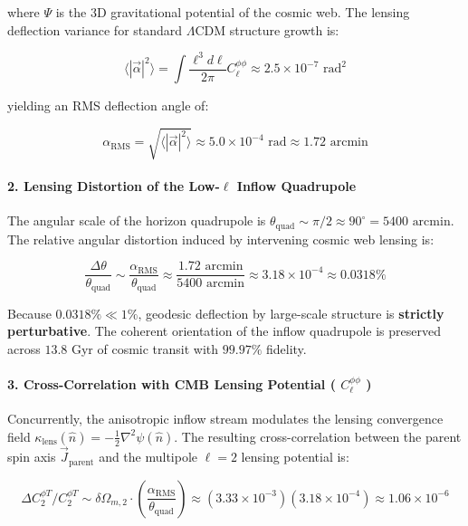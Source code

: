 \documentclass[11pt,a4paper]{article}
\theoremstyle{definition}\newtheorem{definition}{Definition}
\theoremstyle{remark}\newtheorem{remark}{Remark}
\begin{document}
where $\Psi$ is the 3D gravitational potential of the cosmic web.
The lensing deflection variance for standard $\Lambda$CDM structure growth is:


\begin{equation}
\langle |\vec{\alpha}|^2 \rangle = \int \frac{\ell^3 d\ell}{2\pi} C_\ell^{\phi\phi} \approx 2.5 \times 10^{-7}\text{ rad}^2
\end{equation}


yielding an RMS deflection angle of:


\begin{equation}
\alpha_{\text{RMS}} = \sqrt{\langle |\vec{\alpha}|^2 \rangle} \approx 5.0 \times 10^{-4}\text{ rad} \approx 1.72\text{ arcmin}
\end{equation}

\paragraph{2. Lensing Distortion of the Low-$\ell$ Inflow Quadrupole}

The angular scale of the horizon quadrupole is $\theta_{\text{quad}} \sim \pi/2 \approx 90^\circ = 5400\text{ arcmin}$.
The relative angular distortion induced by intervening cosmic web lensing is:


\begin{equation}
\frac{\Delta\theta}{\theta_{\text{quad}}} \sim \frac{\alpha_{\text{RMS}}}{\theta_{\text{quad}}} \approx \frac{1.72\text{ arcmin}}{5400\text{ arcmin}} \approx 3.18 \times 10^{-4} \approx 0.0318\%
\end{equation}


Because $0.0318\% \ll 1\%$, geodesic deflection by large-scale structure is \textbf{strictly perturbative}. The coherent orientation of the inflow quadrupole is preserved across $13.8$ Gyr of cosmic transit with $99.97\%$ fidelity.
\paragraph{3. Cross-Correlation with CMB Lensing Potential ( $C_\ell^{\phi\phi}$ )}

Concurrently, the anisotropic inflow stream modulates the lensing convergence field $\kappa_{\text{lens}}(\hat{n}) = -\frac{1}{2}\nabla^2\psi(\hat{n})$.
The resulting cross-correlation between the parent spin axis $\vec{J}_{\text{parent}}$ and the multipole $\ell = 2$ lensing potential is:


\begin{equation}
\Delta C_2^{\phi T} / C_2^{\phi T} \sim \delta\Omega_{m, 2} \cdot \left(\frac{\alpha_{\text{RMS}}}{\theta_{\text{quad}}}\right) \approx (3.33 \times 10^{-3})(3.18 \times 10^{-4}) \approx 1.06 \times 10^{-6}
\end{equation}
\end{document}
